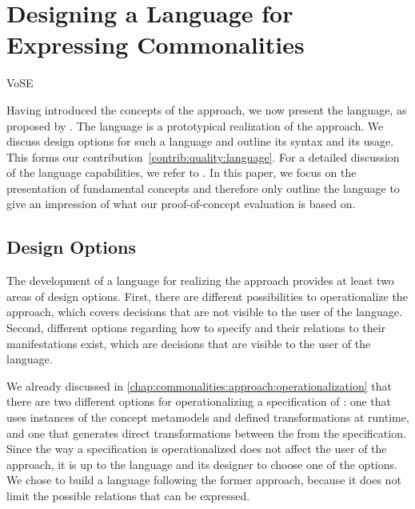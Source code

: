 \chapter{Designing a Language for Expressing Commonalities 
}
\label{chap:language}

\begin{copiedFrom}{VoSE}

Having introduced the concepts of the \commonalities approach, we now present the \commonalities language, as proposed by \textcite{gleitze2017a}.
The language is a prototypical realization of the approach.
We discuss design options for such a language and outline its syntax and its usage.
This forms our contribution~\autoref{contrib:quality:language}.
For a detailed discussion of the language capabilities, we refer to \cite{gleitze2017a}.
In this paper, we focus on the presentation of fundamental concepts  and therefore only outline the language to give an impression of what our proof-of-concept evaluation is based on.


\section{Design Options}

The development of a language for realizing the \commonalities approach provides at least two areas of design options.
First, there are different possibilities to operationalize the approach, which covers decisions that are not visible to the user of the language.
Second, different options regarding how to specify \conceptmetamodels and their relations to their manifestations exist, which are decisions that are visible to the user of the language.

We already discussed in \autoref{chap:commonalities:approach:operationalization} that there are two different options for operationalizing a specification of \commonalities: one that uses instances of the concept metamodels and defined transformations at runtime, and one that generates direct transformations between the \concretemetamodels from the specification.
Since the way a specification is operationalized does not affect the user of the approach, it is up to the language and its designer to choose one of the options.
We chose to build a language following the former approach, because it does not limit the possible relations that can be expressed.


\end{copiedFrom}
